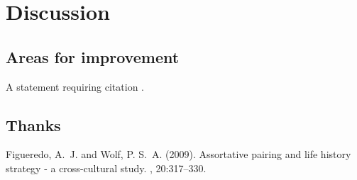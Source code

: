 \documentclass[twoside,twocolumn]{article}
\begin{document}
\section{Discussion}

\subsection{Areas for improvement}

A statement requiring citation \cite{Figueredo:2009dg}.
\blindtext %

\subsection{Thanks}

\blindtext %


\begin{thebibliography}{99} %

Figueredo, A.~J. and Wolf, P. S.~A. (2009).
\newblock Assortative pairing and life history strategy - a cross-cultural
  study.
, 20:317--330.
 
\end{thebibliography}

\end{document}
